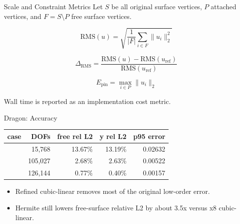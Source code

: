 \documentclass[aspectratio=169,10pt]{beamer}
\newcommand{\case}[1]{\texttt{\detokenize{#1}}}
\newcommand{\pct}[1]{#1\%}
\newcommand{\good}[1]{\textcolor{pgoGreen}{#1}}
\begin{document}
\begin{frame}{Scale and Constraint Metrics}
  \small
  Let $S$ be all original surface vertices, $P$ attached vertices, and
  $F = S \setminus P$ free surface vertices.

  \vspace{0.6em}
  \[
    \mathrm{RMS}(u) =
    \sqrt{\frac{1}{|F|}\sum_{i \in F}\|u_i\|_2^2}
  \]

  \[
    \Delta_{\mathrm{RMS}} =
    \frac{\mathrm{RMS}(u) - \mathrm{RMS}(u_{\mathrm{ref}})}
         {\mathrm{RMS}(u_{\mathrm{ref}})}
  \]

  \[
    E_{\mathrm{pin}} = \max_{i \in P}\|u_i\|_2
  \]

  \vspace{0.6em}
  Wall time is reported as an implementation cost metric.
\end{frame}

\begin{frame}{Dragon: Accuracy}
  \small
  \begin{table}
    \centering
    \begin{tabular}{lrrrr}
      \toprule
      case & DOFs & free rel L2 & y rel L2 & p95 error \\
      \midrule
      \case{cubic_linear} & 15,768 & \pct{13.67} & \pct{13.19} & 0.02632 \\
      \case{cubic_linear_x8} & 105,027 & \pct{2.68} & \pct{2.63} & 0.00522 \\
      \case{cubic_hermite} & 126,144 & \good{\pct{0.77}} & \good{\pct{0.40}} & \good{0.00157} \\
      \bottomrule
    \end{tabular}
  \end{table}

  \vspace{0.8em}
  \begin{itemize}
    \item Refined cubic-linear removes most of the original low-order error.
    \item Hermite still lowers free-surface relative L2 by about 3.5x versus x8 cubic-linear.
  \end{itemize}
\end{frame}
\end{document}
